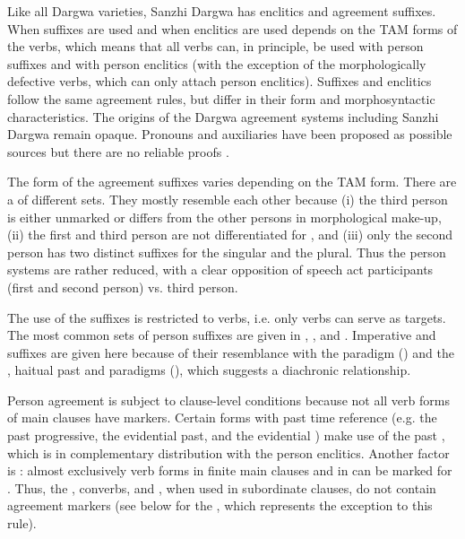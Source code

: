 Like all Dargwa varieties, Sanzhi Dargwa has  enclitics and agreement suffixes. When suffixes are used and when enclitics are used depends on the TAM forms of the verbs, which means that all verbs can, in principle, be used with person suffixes and with person enclitics (with the exception of the morphologically defective  verbs, which can only attach person enclitics). Suffixes and enclitics follow the same agreement rules, but differ in their form and morphosyntactic characteristics. The origins of the Dargwa agreement systems including Sanzhi Dargwa remain opaque. Pronouns and auxiliaries have been proposed as possible sources but there are no reliable proofs \citep[147]{Sumbatova2011}.

The form of the agreement suffixes varies depending on the TAM form. There are a  of different sets. They mostly resemble each other because (i) the third person is either unmarked or differs from the other persons in morphological make-up, (ii) the first and third person are not differentiated for , and (iii) only the second person has two distinct suffixes for the singular and the plural. Thus the person systems are rather reduced, with a clear opposition of speech act participants (first and second person) vs. third person.

The use of the suffixes is restricted to verbs, i.e. only verbs can serve as targets. The most common sets of person suffixes are given in , , and . Imperative and  suffixes are given here because of their resemblance with the  paradigm () and the , haitual past and  paradigms (), which suggests a diachronic relationship.

Person agreement is subject to clause-level conditions because not all verb forms of main clauses have  markers. Certain forms with past time reference (e.g. the past progressive, the evidential past, and the evidential ) make use of the past , which is in complementary distribution with the person enclitics. Another factor is : almost exclusively verb forms in finite main clauses and in  can be marked for . Thus, the , converbs, and , when used in subordinate clauses, do not contain agreement markers (see  below for the , which represents the exception to this rule).
%

